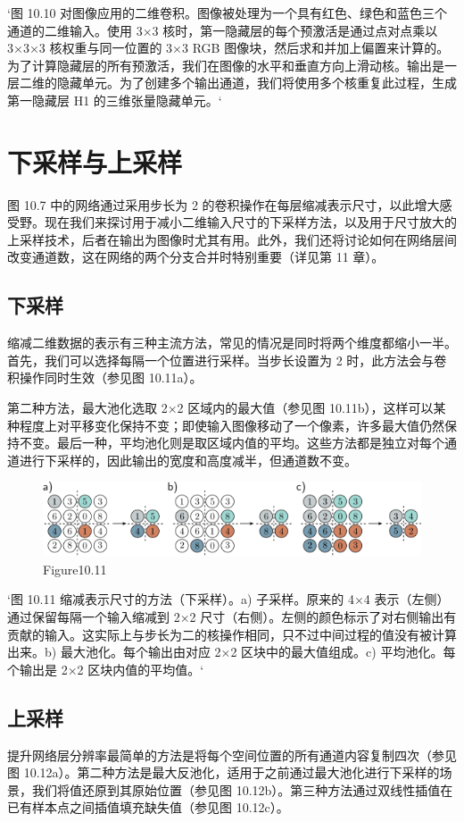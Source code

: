 `图 10.10 对图像应用的二维卷积。图像被处理为一个具有红色、绿色和蓝色三个通道的二维输入。使用 3×3 核时，第一隐藏层的每个预激活是通过点对点乘以 3×3×3 核权重与同一位置的 3×3 RGB 图像块，然后求和并加上偏置来计算的。为了计算隐藏层的所有预激活，我们在图像的水平和垂直方向上滑动核。输出是一层二维的隐藏单元。为了创建多个输出通道，我们将使用多个核重复此过程，生成第一隐藏层 H1 的三维张量隐藏单元。`

\section{下采样与上采样}

图 10.7 中的网络通过采用步长为 2 的卷积操作在每层缩减表示尺寸，以此增大感受野。现在我们来探讨用于减小二维输入尺寸的下采样方法，以及用于尺寸放大的上采样技术，后者在输出为图像时尤其有用。此外，我们还将讨论如何在网络层间改变通道数，这在网络的两个分支合并时特别重要（详见第 11 章）。
\subsection{下采样}
缩减二维数据的表示有三种主流方法，常见的情况是同时将两个维度都缩小一半。首先，我们可以选择每隔一个位置进行采样。当步长设置为 2 时，此方法会与卷积操作同时生效（参见图 10.11a）。

第二种方法，最大池化选取 2×2 区域内的最大值（参见图 10.11b），这样可以某种程度上对平移变化保持不变；即使输入图像移动了一个像素，许多最大值仍然保持不变。最后一种，平均池化则是取区域内值的平均。这些方法都是独立对每个通道进行下采样的，因此输出的宽度和高度减半，但通道数不变。

\begin{figure}[h!]
\centering
\includegraphics[width=0.7\linewidth]{png/chapter10/ConvDown.png}
\caption{Figure10.11}
\end{figure}

`图 10.11 缩减表示尺寸的方法（下采样）。a) 子采样。原来的 4×4 表示（左侧）通过保留每隔一个输入缩减到 2×2 尺寸（右侧）。左侧的颜色标示了对右侧输出有贡献的输入。这实际上与步长为二的核操作相同，只不过中间过程的值没有被计算出来。b) 最大池化。每个输出由对应 2×2 区块中的最大值组成。c) 平均池化。每个输出是 2×2 区块内值的平均值。`

\subsection{上采样}
提升网络层分辨率最简单的方法是将每个空间位置的所有通道内容复制四次（参见图 10.12a）。第二种方法是最大反池化，适用于之前通过最大池化进行下采样的场景，我们将值还原到其原始位置（参见图 10.12b）。第三种方法通过双线性插值在已有样本点之间插值填充缺失值（参见图 10.12c）。


